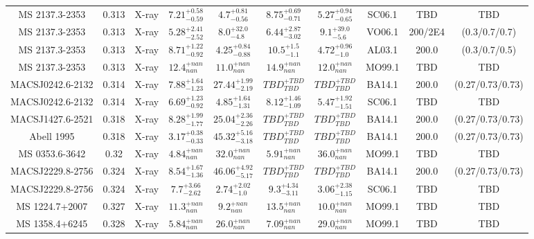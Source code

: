 \begin{table}
\begin{tabular}{cccccccccc}
MS 2137.3-2353 & 0.313 & X-ray & ${7.21}^{+0.58}_{-0.59}$ & ${4.7}^{+0.81}_{-0.56}$ & ${8.75}^{+0.69}_{-0.71}$ & ${5.27}^{+0.94}_{-0.65}$ & SC06.1 & TBD & TBD \\
MS 2137.3-2353 & 0.313 & X-ray & ${5.28}^{+2.41}_{-2.52}$ & ${8.0}^{+32.0}_{-4.8}$ & ${6.44}^{+2.87}_{-3.02}$ & ${9.1}^{+39.0}_{-5.6}$ & VO06.1 & 200/2E4 & (0.3/0.7/0.7) \\
MS 2137.3-2353 & 0.313 & X-ray & ${8.71}^{+1.22}_{-0.92}$ & ${4.25}^{+0.84}_{-0.88}$ & ${10.5}^{+1.5}_{-1.1}$ & ${4.72}^{+0.96}_{-1.0}$ & AL03.1 & 200.0 & (0.3/0.7/0.5) \\
MS 2137.3-2353 & 0.313 & X-ray & ${12.4}^{+nan}_{nan}$ & ${11.0}^{+nan}_{nan}$ & ${14.9}^{+nan}_{nan}$ & ${12.0}^{+nan}_{nan}$ & MO99.1 & TBD & TBD \\
MACSJ0242.6-2132 & 0.314 & X-ray & ${7.88}^{+1.64}_{-1.23}$ & ${27.44}^{+1.99}_{-2.19}$ & ${TBD}^{+TBD}_{TBD}$ & ${TBD}^{+TBD}_{TBD}$ & BA14.1 & 200.0 & (0.27/0.73/0.73) \\
MACSJ0242.6-2132 & 0.314 & X-ray & ${6.69}^{+1.23}_{-0.92}$ & ${4.85}^{+1.64}_{-1.31}$ & ${8.12}^{+1.46}_{-1.09}$ & ${5.47}^{+1.92}_{-1.51}$ & SC06.1 & TBD & TBD \\
MACSJ1427.6-2521 & 0.318 & X-ray & ${8.28}^{+1.99}_{-1.77}$ & ${25.04}^{+2.36}_{-2.26}$ & ${TBD}^{+TBD}_{TBD}$ & ${TBD}^{+TBD}_{TBD}$ & BA14.1 & 200.0 & (0.27/0.73/0.73) \\
Abell 1995 & 0.318 & X-ray & ${3.17}^{+0.38}_{-0.33}$ & ${45.32}^{+5.16}_{-3.18}$ & ${TBD}^{+TBD}_{TBD}$ & ${TBD}^{+TBD}_{TBD}$ & BA14.1 & 200.0 & (0.27/0.73/0.73) \\
MS 0353.6-3642 & 0.32 & X-ray & ${4.84}^{+nan}_{nan}$ & ${32.0}^{+nan}_{nan}$ & ${5.91}^{+nan}_{nan}$ & ${36.0}^{+nan}_{nan}$ & MO99.1 & TBD & TBD \\
MACSJ2229.8-2756 & 0.324 & X-ray & ${8.54}^{+1.67}_{-1.36}$ & ${46.06}^{+4.92}_{-5.17}$ & ${TBD}^{+TBD}_{TBD}$ & ${TBD}^{+TBD}_{TBD}$ & BA14.1 & 200.0 & (0.27/0.73/0.73) \\
MACSJ2229.8-2756 & 0.324 & X-ray & ${7.7}^{+3.66}_{-2.62}$ & ${2.74}^{+2.02}_{-1.0}$ & ${9.3}^{+4.34}_{-3.11}$ & ${3.06}^{+2.38}_{-1.15}$ & SC06.1 & TBD & TBD \\
MS 1224.7+2007 & 0.327 & X-ray & ${11.3}^{+nan}_{nan}$ & ${9.2}^{+nan}_{nan}$ & ${13.5}^{+nan}_{nan}$ & ${10.0}^{+nan}_{nan}$ & MO99.1 & TBD & TBD \\
MS 1358.4+6245 & 0.328 & X-ray & ${5.84}^{+nan}_{nan}$ & ${26.0}^{+nan}_{nan}$ & ${7.09}^{+nan}_{nan}$ & ${29.0}^{+nan}_{nan}$ & MO99.1 & TBD & TBD \\

\end{tabular}
\end{table}
